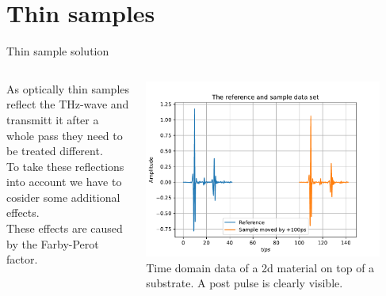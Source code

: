 \documentclass[aspectratio=1610, 9pt]{beamer}
\begin{document}
\section{Thin samples}
\begin{frame}{Thin sample solution}
  \begin{columns}
    \begin{column}{0.5\textwidth}
      As optically thin samples reflect the THz-wave and transmitt it after a whole pass they need to be treated different.\\
      To take these reflections into account we have to cosider some additional effects.\\
      These effects are caused by the Farby-Perot factor.
    \end{column}
    \begin{column}{0.5\textwidth}
      \includegraphics[width=0.9\textwidth]{images/THz_timedomain_thinsample.pdf}
      {Time domain data of a 2d material on top of a substrate. A post pulse is clearly visible.}
    \end{column}
  \end{columns}
\end{frame}

\end{document}
